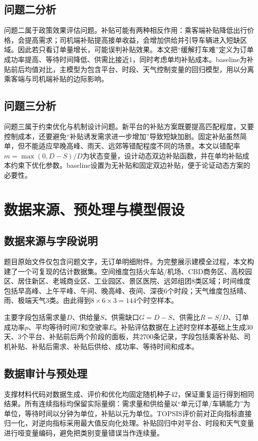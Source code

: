 \documentclass[12pt,a4paper]{ctexart}
\begin{document}
\subsection{问题二分析}
问题二属于政策效果评估问题。补贴可能有两种相反作用：乘客端补贴降低出行价格，会提高需求；司机端补贴提高接单收益，会增加供给并引导车辆进入短缺区域。因此若只看订单量增长，可能误判补贴效果。本文把“缓解打车难”定义为订单成功率提高、等待时间降低、供需比接近1，同时考虑单均补贴成本。baseline为补贴前后均值对比，主模型为包含平台、时段、天气控制变量的回归模型，用以分离乘客端与司机端补贴的边际影响。

\subsection{问题三分析}
问题三属于约束优化与机制设计问题。新平台的补贴方案既要提高匹配程度，又要控制成本，还要避免“补贴诱发需求进一步增加”导致短缺加剧。固定补贴虽然简单，但不能适应早晚高峰、雨天、远郊等错配程度不同的场景。本文以错配率$m=\max(0,D-S)/D$为状态变量，设计动态双边补贴函数，并在单均补贴成本约束下优化参数。baseline设置为无补贴和固定双边补贴，便于论证动态方案的必要性。

\section{数据来源、预处理与模型假设}
\subsection{数据来源与字段说明}
题目原始文件仅包含问题文字，无订单明细附件。为完整展示建模全过程，本文构建了一个可复现的估计数据集。空间维度包括火车站/机场、CBD商务区、高校园区、居住新区、老城商业区、工业园区、景区医院、远郊组团8类区域；时间维度包括早高峰、上午平峰、午间、晚高峰、夜间、深夜6个时段；天气维度包括晴、雨、极端天气3类。由此得到$8\times6\times3=144$个时空样本。

主要字段包括需求量$D$、供给量$S$、供需缺口$G=D-S$、供需比$R=S/D$、订单成功率$p$、平均等待时间$T$和空驶率$E$。补贴评估数据在上述时空样本基础上生成30天、3个平台、补贴前后两个阶段的面板，共2700条记录，字段包括乘客补贴、司机补贴、补贴后需求、补贴后供给、成功率、等待时间和成本。

\subsection{数据审计与预处理}
支撑材料代码对数据生成、评价和优化均固定随机种子42，保证重复运行得到相同结果。所有连续指标均保留实际量纲：需求量和供给量以“单元订单/车辆能力”为单位，等待时间以分钟为单位，补贴以元为单位。TOPSIS评价前对正向指标直接归一化，对逆向指标采用最大值反向化处理。补贴回归中对平台、时段和天气变量进行哑变量编码，避免把类别变量错误当作连续量。
\end{document}
